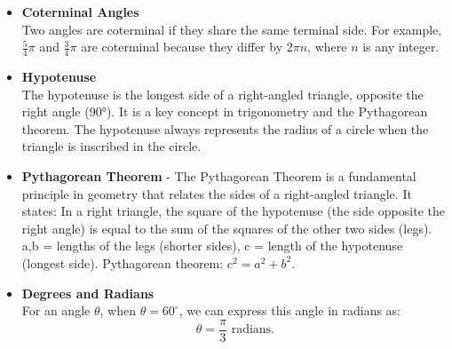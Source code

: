 \documentclass{article}
\begin{document}
\begin{itemize}
    \item \textbf{Coterminal Angles} \\
    Two angles are coterminal if they share the same terminal side. For example, \( \frac{5}{4} \pi \) and \( \frac{3}{4} \pi \) are coterminal because they differ by \( 2\pi n \), where \( n \) is any integer.

    \item \textbf{Hypotenuse} \\
    The hypotenuse is the longest side of a right-angled triangle, opposite the right angle (90°). It is a key concept in trigonometry and the Pythagorean theorem. The hypotenuse always represents the radius of a circle when the triangle is inscribed in the circle.

    
  \item \textbf{Pythagorean Theorem} - The Pythagorean Theorem is a fundamental principle in geometry that relates the sides of a right-angled triangle. It states:
    In a right triangle, the square of the hypotenuse (the side opposite the right angle) is equal to the sum of the squares of the other two sides (legs).
    a,b = lengths of the legs (shorter sides),
    c = length of the hypotenuse (longest side).
    Pythagorean theorem: $c^2 = a^2 + b^2 $.  

    \item \textbf{Degrees and Radians} \\
    For an angle \( \theta \), when \( \theta = 60^\circ \), we can express this angle in radians as:
    \[
    \theta = \frac{\pi}{3} \text{ radians.}
    \]
\end{itemize}
\end{document}
